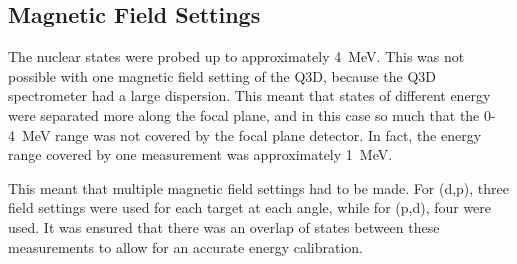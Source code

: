 \subsection{Magnetic Field Settings}

The nuclear states were probed up to approximately \SI{4}{\mega\electronvolt}. This was not possible with one magnetic field setting of the Q3D, because the Q3D spectrometer had a large dispersion. This meant that states of different energy were separated more along the focal plane, and in this case so much that the 0-\SI{4}{\mega\electronvolt} range was not covered by the focal plane detector. In fact, the energy range covered by one measurement was approximately \SI{1}{MeV}.

This meant that multiple magnetic field settings had to be made. For (d,p), three field settings were used for each target at each angle, while for (p,d), four were used. It was ensured that there was an overlap of states between these measurements to allow for an accurate energy calibration.